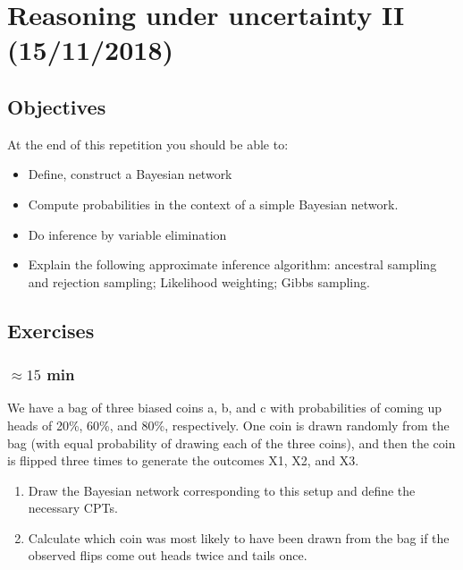 \documentclass[a4paper, 10pt]{article}
\begin{document}


   \setcounter{page}{1}
   \section{Reasoning under uncertainty II (15/11/2018)}
   \subsection{Objectives}
      At the end of this repetition you should be able to:
      \begin{itemize}
          \item Define, construct a Bayesian network
          \item Compute probabilities in the context of a simple Bayesian network.
          \item Do inference by variable elimination
          \item Explain the following approximate inference algorithm: ancestral sampling and rejection sampling; Likelihood weighting; Gibbs sampling.
      \end{itemize}
\subsection{Exercises}
\subsubsection{$\approx 15$ min}
We have a bag of three biased coins a, b, and c with probabilities of coming up heads
of 20\%, 60\%, and 80\%, respectively. One coin is drawn randomly from the bag (with equal
probability of drawing each of the three coins), and then the coin is flipped three times to
generate the outcomes X1, X2, and X3.
\begin{enumerate}
    \item Draw the Bayesian network corresponding to this setup and define the necessary CPTs.
    \item Calculate which coin was most likely to have been drawn from the bag if the observed
flips come out heads twice and tails once.
\end{enumerate}
\end{document}
